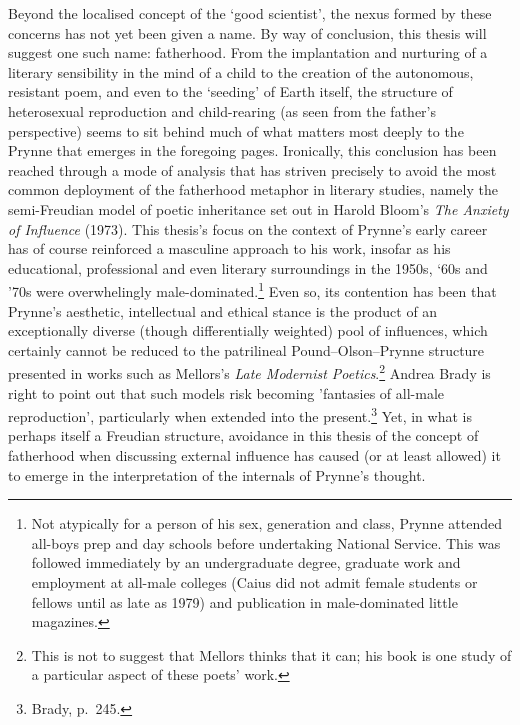 \documentclass[]{article}
\begin{document}
Beyond the localised concept of the ‘good scientist’, the nexus formed
by these concerns has not yet been given a name. By way of conclusion,
this thesis will suggest one such name: fatherhood. From the
implantation and nurturing of a literary sensibility in the mind of a
child to the creation of the autonomous, resistant poem, and even to the
‘seeding’ of Earth itself, the structure of heterosexual reproduction
and child-rearing (as seen from the father’s perspective) seems to sit
behind much of what matters most deeply to the Prynne that emerges in
the foregoing pages. Ironically, this conclusion has been reached
through a mode of analysis that has striven precisely to avoid the most
common deployment of the fatherhood metaphor in literary studies, namely
the semi-Freudian model of poetic inheritance set out in Harold Bloom’s
\emph{The Anxiety of Influence} (1973). This thesis’s focus on the
context of Prynne’s early career has of course reinforced a masculine
approach to his work, insofar as his educational, professional and even
literary surroundings in the 1950s, ‘60s and ’70s were overwhelingly
male-dominated.\footnote{Not atypically for a person of his sex,
  generation and class, Prynne attended all-boys prep and day schools
  before undertaking National Service. This was followed immediately by
  an undergraduate degree, graduate work and employment at all-male
  colleges (Caius did not admit female students or fellows until as late
  as 1979) and publication in male-dominated little magazines.} Even so,
its contention has been that Prynne’s aesthetic, intellectual and
ethical stance is the product of an exceptionally diverse (though
differentially weighted) pool of influences, which certainly cannot be
reduced to the patrilineal Pound–Olson–Prynne structure presented in
works such as Mellors’s \emph{Late Modernist Poetics}.\footnote{This is
  not to suggest that Mellors thinks that it can; his book is one study
  of a particular aspect of these poets’ work.} Andrea Brady is right to
point out that such models risk becoming ’fantasies of all-male
reproduction’, particularly when extended into the present.\footnote{Brady,
  p.~245.} Yet, in what is perhaps itself a Freudian structure,
avoidance in this thesis of the concept of fatherhood when discussing
external influence has caused (or at least allowed) it to emerge in the
interpretation of the internals of Prynne’s thought.
\end{document}
